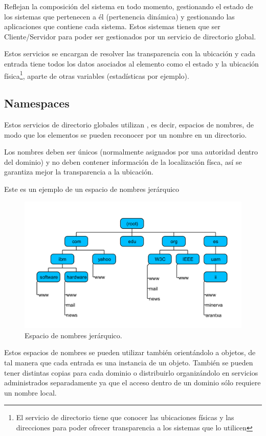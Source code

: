 Reflejan la composición del sistema en todo momento, gestionando el estado de los sistemas que pertenecen a él (pertenencia dinámica) y gestionando las aplicaciones que contiene cada sistema. Estos sistemas tienen que ser Cliente/Servidor para poder ser gestionados por un servicio de directorio global.

Estos servicios se encargan de resolver las transparencia con la ubicación y cada entrada tiene todos los datos asociados al elemento como el estado y la ubicación física\footnote{El servicio de directorio tiene que conocer las ubicaciones físicas y las direcciones para poder ofrecer transparencia a los sistemas que lo utilicen}, aparte de otras variables (estadísticas por ejemplo).


\subsection{Namespaces}
Estos servicios de directorio globales utilizan , es decir, espacios de nombres, de modo que los elementos se pueden reconocer por un nombre en un directorio.

Los nombres deben ser únicos (normalmente asignados por una autoridad dentro del dominio) y no deben contener información de la localización físca, así se garantiza mejor la transparencia a la ubicación.

Este es un ejemplo de un espacio de nombres jerárquico


\begin{figure}[hbtp]
\centering
\includegraphics[width=1\textwidth]{img/namespaces.png}
\caption{Espacio de nombres jerárquico.}
\label{namespaces}
\end{figure}

Estos espacios de nombres se pueden utilizar también orientándolo a objetos, de tal manera que cada entrada es una instancia de un objeto. También se pueden tener distintas copias para cada dominio o distribuirlo organizándolo en servicios administrados separadamente ya que el acceso dentro de un dominio sólo requiere un nombre local.

